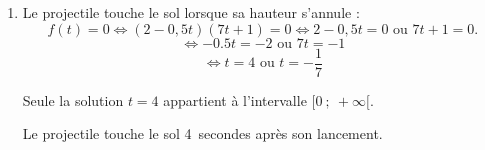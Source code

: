 \begin{enumerate}
\begin{enumerate}
Les solutions sont
		\[t_1 = 1 \qquad\text{et}\qquad t_2  \approx 2,85.\]

La hauteur du projectile est supérieure ou égale à 12~m sur l'intervalle de temps $[1 ; 2,85]$ (en secondes).

		\item Le projectile touche le sol lorsque sa hauteur s'annule :
		\[f(t) = 0 \iff (2-0,5t)(7t+1) = 0 \iff 2-0,5t = 0 \text{ ou }7t+1=0.\]
		\[ \iff -0.5t = -2 \text{ ou } 7t = -1\]
		\[ \iff t = 4 \text{ ou } t = -\frac{1}{7}\]
		
		Seule la solution $t = 4$ appartient à l'intervalle $[0~;~+\infty[$.

		Le projectile touche le sol 4~secondes après son lancement.
	\end{enumerate}
\end{enumerate}

